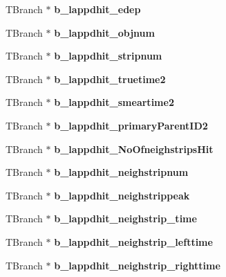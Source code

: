 \begin{DoxyCompactItemize}
\item 
\hypertarget{classLAPPDTree_aa1dde2f8ca08d72d9f6ef2614935909f}{
TBranch $\ast$ {\bfseries b\_\-lappdhit\_\-edep}}
\label{classLAPPDTree_aa1dde2f8ca08d72d9f6ef2614935909f}

\item 
\hypertarget{classLAPPDTree_a8f6eea3420011bb1a15307d4ab38c8fd}{
TBranch $\ast$ {\bfseries b\_\-lappdhit\_\-objnum}}
\label{classLAPPDTree_a8f6eea3420011bb1a15307d4ab38c8fd}

\item 
\hypertarget{classLAPPDTree_a719cbac920cf65ff67af978dfbac12d2}{
TBranch $\ast$ {\bfseries b\_\-lappdhit\_\-stripnum}}
\label{classLAPPDTree_a719cbac920cf65ff67af978dfbac12d2}

\item 
\hypertarget{classLAPPDTree_a3ba0a48b444731d20574179863c896a6}{
TBranch $\ast$ {\bfseries b\_\-lappdhit\_\-truetime2}}
\label{classLAPPDTree_a3ba0a48b444731d20574179863c896a6}

\item 
\hypertarget{classLAPPDTree_a18aee356c45455494e3168712bc31f81}{
TBranch $\ast$ {\bfseries b\_\-lappdhit\_\-smeartime2}}
\label{classLAPPDTree_a18aee356c45455494e3168712bc31f81}

\item 
\hypertarget{classLAPPDTree_a41a93215c8835469b83d7ba9b5910783}{
TBranch $\ast$ {\bfseries b\_\-lappdhit\_\-primaryParentID2}}
\label{classLAPPDTree_a41a93215c8835469b83d7ba9b5910783}

\item 
\hypertarget{classLAPPDTree_a325d2982f6d588f05a852ca75aa850f8}{
TBranch $\ast$ {\bfseries b\_\-lappdhit\_\-NoOfneighstripsHit}}
\label{classLAPPDTree_a325d2982f6d588f05a852ca75aa850f8}

\item 
\hypertarget{classLAPPDTree_a54214ff49a3743466717febd048e0d20}{
TBranch $\ast$ {\bfseries b\_\-lappdhit\_\-neighstripnum}}
\label{classLAPPDTree_a54214ff49a3743466717febd048e0d20}

\item 
\hypertarget{classLAPPDTree_aa7b113f55684fabe737895d860c8ec7e}{
TBranch $\ast$ {\bfseries b\_\-lappdhit\_\-neighstrippeak}}
\label{classLAPPDTree_aa7b113f55684fabe737895d860c8ec7e}

\item 
\hypertarget{classLAPPDTree_ab8c7888fd048b0d5b6d8c15634ee7919}{
TBranch $\ast$ {\bfseries b\_\-lappdhit\_\-neighstrip\_\-time}}
\label{classLAPPDTree_ab8c7888fd048b0d5b6d8c15634ee7919}

\item 
\hypertarget{classLAPPDTree_adbf2e61a53af0c4f535b64b90e942f27}{
TBranch $\ast$ {\bfseries b\_\-lappdhit\_\-neighstrip\_\-lefttime}}
\label{classLAPPDTree_adbf2e61a53af0c4f535b64b90e942f27}

\item 
\hypertarget{classLAPPDTree_ae3992ee3c8fb6400ae25486d15bba708}{
TBranch $\ast$ {\bfseries b\_\-lappdhit\_\-neighstrip\_\-righttime}}
\label{classLAPPDTree_ae3992ee3c8fb6400ae25486d15bba708}

\end{DoxyCompactItemize}


